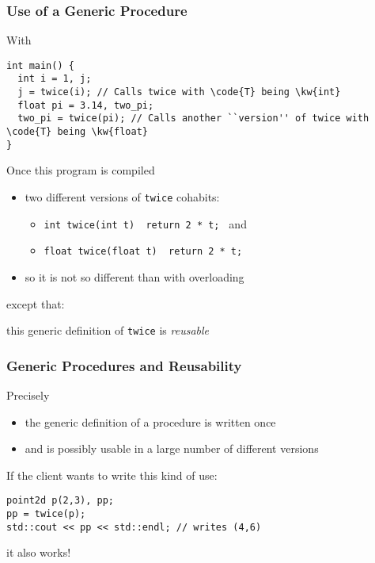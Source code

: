 \documentclass{beamer}
\newcommand{\kw}[1]{{\color{blue}{\texttt{#1}}}\xspace}
\newcommand{\code}[1]{{\scriptsize{\texttt{#1}}}\xspace}
\begin{document}
\begin{frame}[fragile]
  \frametitle{Use of a Generic Procedure}

With
\begin{lstlisting}
int main() {
  int i = 1, j;
  j = twice(i); // Calls twice with \code{T} being \kw{int}
  float pi = 3.14, two_pi;
  two_pi = twice(pi); // Calls another ``version'' of twice with \code{T} being \kw{float}
}
\end{lstlisting}


Once this program is compiled
\begin{itemize}
\item two different versions of \code{twice} cohabits:
  \begin{itemize}
  \item \code{int   twice(int   t) { return 2 * t; }} and
  \item \code{float twice(float t) { return 2 * t; }}
  \end{itemize}
\item so it is not so different than with overloading
\end{itemize}

except that:
\begin{center}
  this generic definition of \code{twice} is \emph{reusable}
\end{center}

\end{frame}


\begin{frame}[fragile]
  \frametitle{Generic Procedures and Reusability}

Precisely
\begin{itemize}
\item the generic definition of a procedure is written once
\item and is possibly usable in a large number of different versions
\end{itemize}

If the client wants to write this kind of use:
\begin{lstlisting}
point2d p(2,3), pp;
pp = twice(p);
std::cout << pp << std::endl; // writes (4,6)
\end{lstlisting} %
it also works!

\end{frame}


\end{document}
